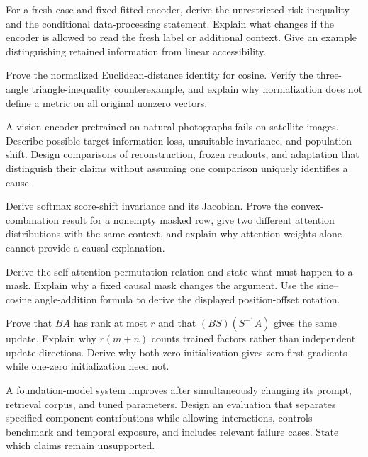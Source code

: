 \begin{challengeexercises}
\item {}For a fresh case and fixed fitted encoder, derive the unrestricted-risk inequality and the conditional data-processing statement. Explain what changes if the encoder is allowed to read the fresh label or additional context. Give an example distinguishing retained information from linear accessibility.
\item {}Prove the normalized Euclidean-distance identity for cosine. Verify the three-angle triangle-inequality counterexample, and explain why normalization does not define a metric on all original nonzero vectors.
\item {}A vision encoder pretrained on natural photographs fails on satellite images. Describe possible target-information loss, unsuitable invariance, and population shift. Design comparisons of reconstruction, frozen readouts, and adaptation that distinguish their claims without assuming one comparison uniquely identifies a cause.
\item {}Derive softmax score-shift invariance and its Jacobian. Prove the convex-combination result for a nonempty masked row, give two different attention distributions with the same context, and explain why attention weights alone cannot provide a causal explanation.
\item {}Derive the self-attention permutation relation and state what must happen to a mask. Explain why a fixed causal mask changes the argument. Use the sine--cosine angle-addition formula to derive the displayed position-offset rotation.
\item {}Prove that $BA$ has rank at most $r$ and that $(BS)(S^{-1}A)$ gives the same update. Explain why $r(m+n)$ counts trained factors rather than independent update directions. Derive why both-zero initialization gives zero first gradients while one-zero initialization need not.
\item {}A foundation-model system improves after simultaneously changing its prompt, retrieval corpus, and tuned parameters. Design an evaluation that separates specified component contributions while allowing interactions, controls benchmark and temporal exposure, and includes relevant failure cases. State which claims remain unsupported.
\end{challengeexercises}

\clearpage
\begingroup\pagestyle{empty}\cleardoublepage\endgroup
\endgroup
